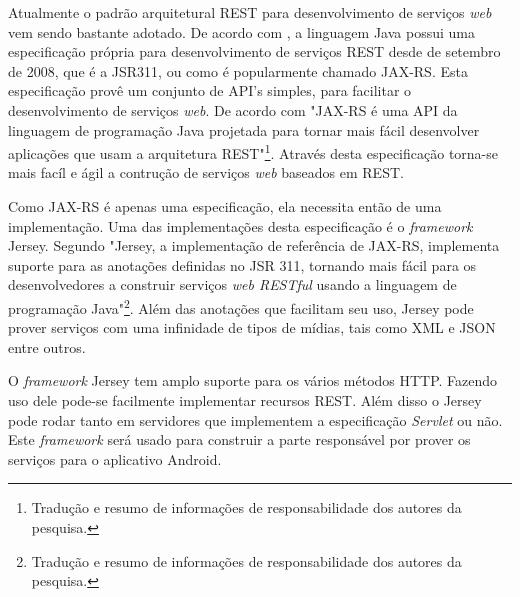 
	\par Atualmente o padrão arquitetural REST para desenvolvimento de serviços
\textit{web} vem sendo bastante adotado. De acordo com
, a linguagem Java possui uma especificação
própria para desenvolvimento de serviços REST desde de setembro de 2008, que é
a JSR311, ou como é popularmente chamado JAX-RS. Esta especificação provê um
conjunto de API's simples, para facilitar o desenvolvimento de serviços
\textit{web}. De acordo com  "JAX-RS é uma API da
linguagem de programação Java projetada para tornar mais fácil
desenvolver aplicações que usam a arquitetura REST"\footnote{Tradução e resumo
de informações de responsabilidade dos autores da pesquisa.}. Através desta
especificação torna-se mais facíl e ágil a contrução de serviços \textit{web}
baseados em REST.

	\par Como JAX-RS é apenas uma especificação, ela necessita então de uma
implementação. Uma das implementações desta especificação é o
\textit{framework} Jersey. Segundo  "Jersey, a
implementação de referência de JAX-RS, implementa suporte para as anotações
definidas no JSR 311, tornando mais fácil para os desenvolvedores a construir
serviços \textit{web RESTful} usando a linguagem de programação
Java"\footnote{Tradução e resumo de informações de responsabilidade
dos autores da pesquisa.}. Além das anotações que facilitam seu uso,
Jersey pode prover serviços com uma infinidade de tipos de
mídias, tais como XML e JSON entre outros.

	\par O \textit{framework} Jersey tem amplo suporte para os vários métodos
HTTP. Fazendo uso dele pode-se facilmente implementar recursos REST. Além
disso o Jersey  pode rodar tanto em servidores que implementem a
especificação \textit{Servlet} ou não. Este \textit{framework} será usado para
construir a parte responsável por prover os serviços para o aplicativo
Android.
